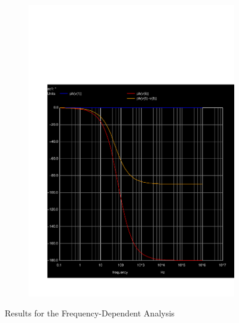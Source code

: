 \begin{figure}[ht]
\begin{subfigure}{.25\textwidth}
\end{subfigure}
\begin{subfigure}{.25\textwidth}
  \centering
  \includegraphics[width=\linewidth]{../sim/ph.pdf}
\end{subfigure}
\caption{Results for the Frequency-Dependent Analysis}
\label{fig:sbs3}
\end{figure}